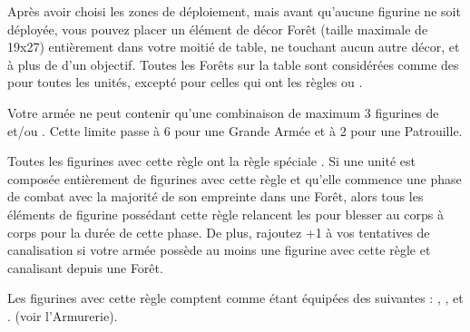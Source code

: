 \newcommand{\hawthornpointsrule}{%
\feyarrows avec la règle \poisonedattacks{}.
}

\newcommand{\briarmaidensmagicrule}{%
\wizardconclave{} avec \whitemagiczero{} (Discipline \whitemagic{}), \wildernessfour{} (Discipline \wilderness{}).
}

\newcommand{\poisonedthornrule}{%
Arme de Tir avec le profil suivant : \range{12}, Force 3, \quicktofire{}, \armourpiercing{1}, \poisonnedattacks{}.
}





\startarmywiderules

\armyspecialruleentry{\theforestfollows}

Après avoir choisi les zones de déploiement, mais avant qu'aucune figurine ne soit déployée, vous pouvez placer un élément de décor Forêt (taille maximale de \unit{19x27}{\centi\metre}) entièrement dans votre moitié de table, ne touchant aucun autre décor, et à plus de  d'un objectif. Toutes les Forêts sur la table sont considérées comme des  pour toutes les unités, excepté pour celles qui ont les règles \strider{} ou \strider{\forest}. 

\armyspecialruleentry{\theforestfollows}

Votre armée ne peut contenir qu'une combinaison de maximum 3 figurines de \treefathers{} et/ou \treefatherancients{}. Cette limite passe à 6 pour une Grande Armée et à 2 pour une Patrouille.

\closearmywiderules

\vspace*{1.5cm}
\startarmyspecialrules

\armyspecialruleentry{\forestwalker}

Toutes les figurines avec cette règle ont la règle spéciale \strider{\forest}. Si une unité est composée entièrement de figurines avec cette règle et qu'elle commence une phase de combat avec la majorité de son empreinte dans une Forêt, alors tous les éléments de figurine possédant cette règle relancent les  pour blesser au corps à corps pour la durée de cette phase. De plus, rajoutez +1 à vos tentatives de canalisation si votre armée possède au moins une figurine avec cette règle et canalisant depuis une Forêt. 

\armyspecialruleentry{\masterarchers}

Les figurines avec cette règle comptent comme étant équipées des \feyarrows{} suivantes : \truemarkarrows{}, \starlightshaft{}, \perforatingtip et \jewelweedshot. (voir l'Armurerie).


